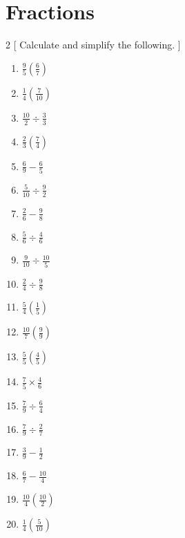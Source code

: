\documentclass[fleqn]{article}
\begin{document}
\section{Fractions}
\begin{multicols}{2}
[
Calculate and simplify the following.
]
\begin{enumerate}[label=(\alph*)]
\item $ \displaystyle \frac{9}{5} \left( \frac{6}{7} \right) $
\item $ \displaystyle \frac{1}{4} \left( \frac{7}{10} \right) $
\item $ \displaystyle \frac{10}{2} \div \frac{3}{3} $
\item $ \displaystyle \frac{2}{3} \left( \frac{7}{4} \right) $
\item $ \displaystyle \frac{6}{9} - \frac{6}{5} $
\item $ \displaystyle \frac{5}{10} \div \frac{9}{2} $
\item $ \displaystyle \frac{2}{6} - \frac{9}{8} $
\item $ \displaystyle \frac{5}{6} \div \frac{4}{6} $
\item $ \displaystyle \frac{9}{10} \div \frac{10}{5} $
\item $ \displaystyle \frac{2}{4} \div \frac{9}{8} $
\item $ \displaystyle \frac{5}{4} \left( \frac{1}{5} \right) $
\item $ \displaystyle \frac{10}{7} \left( \frac{9}{9} \right) $
\item $ \displaystyle \frac{5}{5} \left( \frac{4}{5} \right) $
\item $ \displaystyle \frac{7}{5} \times \frac{4}{6} $
\item $ \displaystyle \frac{7}{9} \div \frac{6}{4} $
\item $ \displaystyle \frac{7}{9} \div \frac{2}{7} $
\item $ \displaystyle \frac{3}{9} - \frac{1}{2} $
\item $ \displaystyle \frac{6}{7} - \frac{10}{4} $
\item $ \displaystyle \frac{10}{4} \left( \frac{10}{2} \right) $
\item $ \displaystyle \frac{1}{4} \left( \frac{5}{10} \right) $

\end{enumerate}
\end{multicols}
\end{document}
